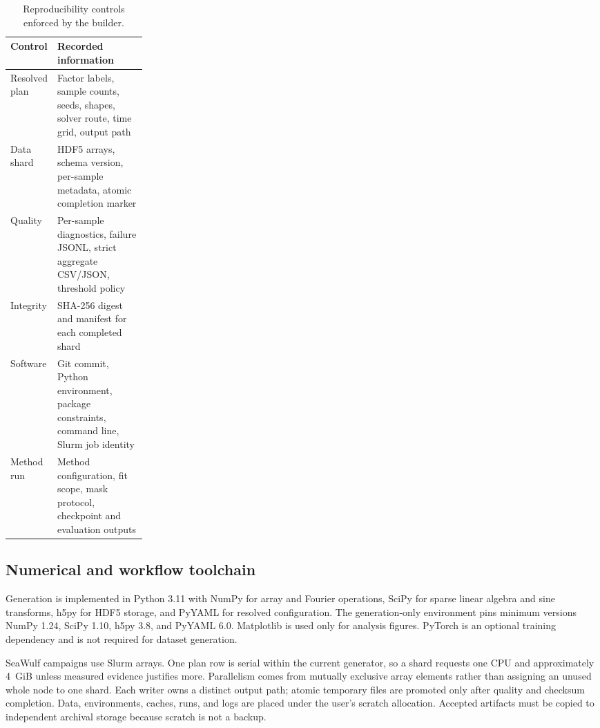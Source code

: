 \documentclass[10pt]{article}
\begin{document}
\begin{table}[t]
\centering
\caption{Reproducibility controls enforced by the builder.}
\label{tab:repro-controls}
\small
\begin{tabularx}{\linewidth}{@{}p{0.23\linewidth}Y@{}}
\toprule
Control & Recorded information \\
\midrule
Resolved plan & Factor labels, sample counts, seeds, shapes, solver route, time grid, output path \\
Data shard & HDF5 arrays, schema version, per-sample metadata, atomic completion marker \\
Quality & Per-sample diagnostics, failure JSONL, strict aggregate CSV/JSON, threshold policy \\
Integrity & SHA-256 digest and manifest for each completed shard \\
Software & Git commit, Python environment, package constraints, command line, Slurm job identity \\
Method run & Method configuration, fit scope, mask protocol, checkpoint and evaluation outputs \\
\bottomrule
\end{tabularx}
\end{table}

\subsection{Numerical and workflow toolchain}

Generation is implemented in Python 3.11 with NumPy for array and Fourier
operations, SciPy for sparse linear algebra and sine transforms, h5py for HDF5
storage, and PyYAML for resolved configuration.  The generation-only
environment pins minimum versions NumPy 1.24, SciPy 1.10, h5py 3.8, and PyYAML
6.0.  Matplotlib is used only for analysis figures.  PyTorch is an optional
training dependency and is not required for dataset generation.

SeaWulf campaigns use Slurm arrays.  One plan row is serial within the current
generator, so a shard requests one CPU and approximately 4~GiB unless measured
evidence justifies more.  Parallelism comes from mutually exclusive array
elements rather than assigning an unused whole node to one shard.  Each writer
owns a distinct output path; atomic temporary files are promoted only after
quality and checksum completion.  Data, environments, caches, runs, and logs
are placed under the user's scratch allocation.  Accepted artifacts must be
copied to independent archival storage because scratch is not a backup.
\end{document}
